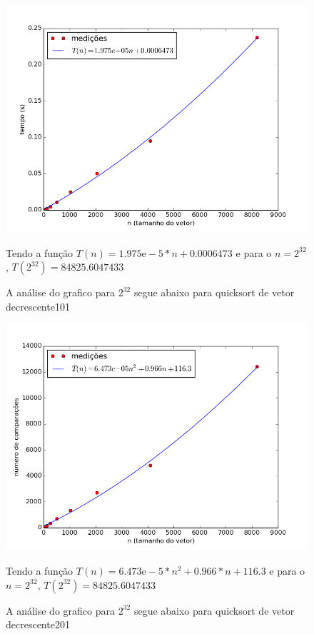 \documentclass[12pt,a4paper,twoside]{report}
\begin{document}


\begin{figure}[ht]
\centering \includegraphics[scale=0.8]{../quicksort/imagens/quicksortQuaseDecresc200.png}
\caption{A análise do grafico para $2^{32}$ segue abaixo para quicksort de vetor decrescente101}

Tendo a função $T(n) = 1.975\mathrm{e}-5*n+0.0006473$ e para o $n =2^{32}$, $T(2^{32}) = 84825.6047433$ 

\label{fig:quicksortQuaseDecresc200}
\end{figure}

\begin{figure}[ht]
\centering \includegraphics[scale=0.8]{../quicksort/imagens/quicksortQuaseDecresc201.png}
\caption{A análise do grafico para $2^{32}$ segue abaixo para quicksort de vetor decrescente201}

Tendo a função $T(n) = 6.473\mathrm{e}-5*n^2+0.966*n + 116.3$ e para o $n =2^{32}$, $T(2^{32}) = 84825.6047433$ 

\label{fig:quicksortQuaseDecresc201}
\end{figure}
\end{document}

